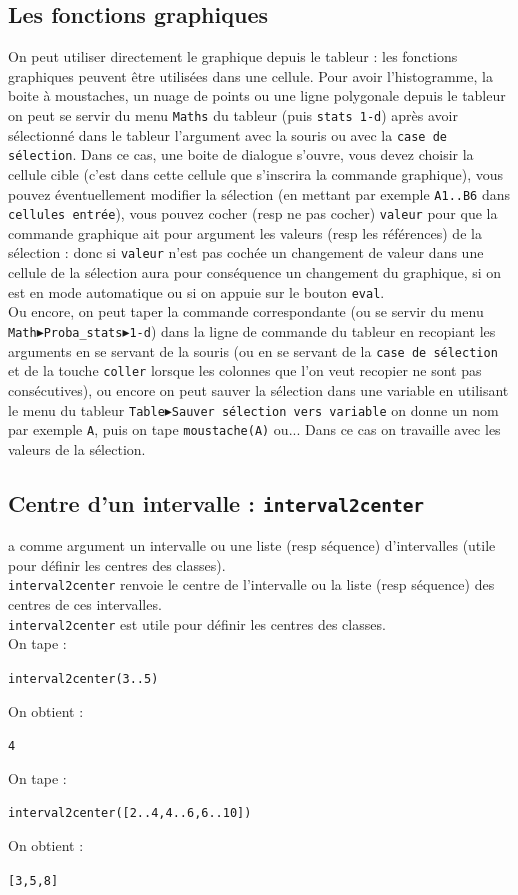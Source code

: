 \documentclass[a4paper,11pt]{book}
\begin{document}
\subsection{Les fonctions graphiques}
On peut utiliser directement le graphique depuis le tableur : les fonctions 
graphiques peuvent \^etre utilis\'ees dans une cellule. Pour avoir 
l'histogramme, la boite \`a moustaches, un nuage de points ou une ligne 
polygonale  depuis le tableur on peut se servir du menu {\tt Maths} du
tableur (puis {\tt stats 1-d}) apr\`es avoir s\'electionn\'e dans le 
tableur l'argument avec la souris ou avec la {\tt case de s\'election}.
Dans ce cas, une boite de dialogue s'ouvre, vous devez choisir la cellule cible
(c'est dans cette cellule que s'inscrira la commande graphique), vous pouvez
\'eventuellement modifier la s\'election (en mettant par exemple {\tt A1..B6}
dans {\tt cellules entr\'ee}), vous pouvez cocher (resp ne pas cocher) 
{\tt valeur} pour que la commande graphique ait pour argument les valeurs 
(resp les r\'ef\'erences) de la s\'election : donc si {\tt valeur} n'est pas 
coch\'ee un changement de valeur dans une cellule de la s\'election aura pour 
cons\'equence un changement du graphique, si on est en mode automatique ou si 
on appuie sur le bouton {\tt eval}.\\
Ou encore, on peut taper la commande correspondante (ou se servir du menu 
{\tt Math$\blacktriangleright$Proba\_stats$\blacktriangleright$1-d}) dans la 
ligne de commande du tableur en recopiant les arguments en se servant de la 
souris (ou en se servant de la {\tt case de s\'election} et de la touche 
{\tt coller} lorsque les colonnes que l'on veut recopier ne sont pas 
cons\'ecutives), ou encore on peut sauver la s\'election dans une variable en 
utilisant le menu du tableur 
{\tt Table$\blacktriangleright$Sauver s\'election vers variable} on 
donne un nom par exemple {\tt A}, puis on tape {\tt moustache(A)} ou... Dans ce
cas on travaille avec les valeurs de la s\'election.\\

\subsection{Centre d'un intervalle : {\tt interval2center}}
 a comme argument un intervalle ou une liste
(resp s\'equence) d'intervalles (utile pour d\'efinir les centres des classes).\\
{\tt interval2center} renvoie le centre de l'intervalle ou la liste 
(resp s\'equence) des centres de ces intervalles.\\
{\tt interval2center} est utile pour d\'efinir les centres des classes.\\
On tape :
\begin{center}{\tt interval2center(3..5)}\end{center}
On obtient :
\begin{center}{\tt 4}\end{center}
On tape :
\begin{center}{\tt interval2center([2..4,4..6,6..10])}\end{center}
On obtient :
\begin{center}{\tt [3,5,8]}\end{center}
\end{document}
